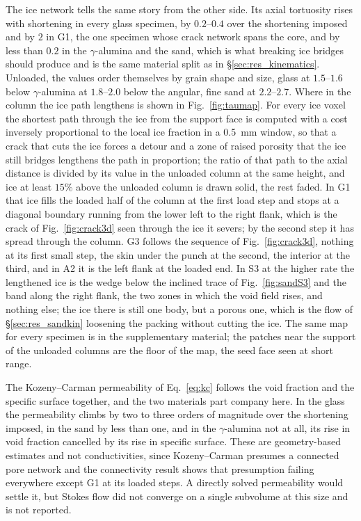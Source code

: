 \documentclass[preprint,12pt,numbers]{elsarticle}
\begin{document}
  The ice network tells the same story from the other side.  Its axial
  tortuosity rises with shortening in every glass specimen, by $0.2$--$0.4$
  over the shortening imposed and by $2$ in G1, the one specimen whose crack
  network spans the core, and by less than $0.2$ in the $\gamma$-alumina and
  the sand, which is what breaking ice bridges should produce and is the same
  material split as in \S\ref{sec:res_kinematics}.  Unloaded, the values
  order themselves by grain shape and size, glass at $1.5$--$1.6$ below
  $\gamma$-alumina at $1.8$--$2.0$ below the angular, fine sand at
  $2.2$--$2.7$.  Where in the column the ice path lengthens is shown in
  Fig.~\ref{fig:taumap}.  For every ice voxel the shortest path through the
  ice from the support face is computed with a cost inversely proportional
  to the local ice fraction in a \SI{0.5}{\milli\meter} window, so that a
  crack that cuts the ice forces a detour and a zone of raised porosity that
  the ice still bridges lengthens the path in proportion; the ratio of that
  path to the axial distance is divided by its value in the unloaded column
  at the same height, and ice at least $15\%$ above the unloaded column is
  drawn solid, the rest faded.  In G1 that ice fills the loaded half of the
  column at the first load step and stops at a diagonal boundary running
  from the lower left to the right flank, which is the crack of
  Fig.~\ref{fig:crack3d} seen through the ice it severs; by the second step
  it has spread through the column.  G3 follows the sequence of
  Fig.~\ref{fig:crack3d}, nothing at its first small step, the skin under
  the punch at the second, the interior at the third, and in A2 it is the
  left flank at the loaded end.  In S3 at the higher rate the lengthened ice
  is the wedge below the inclined trace of Fig.~\ref{fig:sandS3} and the
  band along the right flank, the two zones in which the void field rises,
  and nothing else; the ice there is still one body, but a porous one, which
  is the flow of \S\ref{sec:res_sandkin} loosening the packing without
  cutting the ice.  The same map for every specimen is in the supplementary
  material; the patches near the support of the unloaded columns are the
  floor of the map, the seed face seen at short range.



  The Kozeny--Carman permeability of Eq.~\eqref{eq:kc} follows the void
  fraction and the specific surface together, and the two materials part
  company here.  In the glass the permeability climbs by two to three orders
  of magnitude over the shortening imposed, in the sand by less than one, and
  in the $\gamma$-alumina not at all, its rise in void fraction cancelled by
  its rise in specific surface.  These are geometry-based estimates and not
  conductivities, since Kozeny--Carman presumes a connected pore network and
  the connectivity result shows that presumption failing everywhere except G1
  at its loaded steps.  A directly
  solved permeability would settle it, but Stokes flow did not converge on a
  single subvolume at this size and is not reported.
\end{document}
